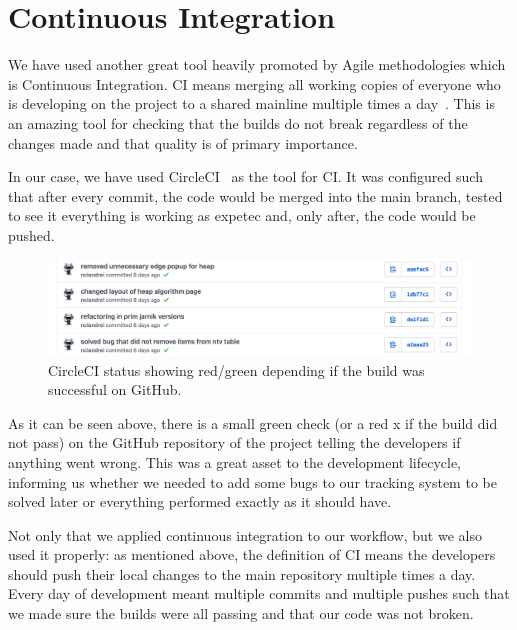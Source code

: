 \documentclass{l4proj}
\begin{document}
\section{Continuous Integration}

We have used another great tool heavily promoted by Agile methodologies which is Continuous Integration. CI means
merging all working copies of everyone who is developing on the project to a shared mainline multiple times a
day~\cite{continuous-integration}. This is an amazing tool for checking that the builds do not break regardless of the
changes made and that quality is of primary importance.

In our case, we have used CircleCI~\cite{circleci} as the tool for CI. It was configured such that after every
commit, the code would be merged into the main branch, tested to see it everything is working as expetec and, only
after, the code would be pushed.

\begin{figure}[!ht]
    \centering
    \includegraphics[scale=0.5]{circleci}
    \caption{CircleCI status showing red/green depending if the build was successful on GitHub.}
    \label{fig:circleci}
\end{figure}

As it can be seen above, there is a small green check (or a red x if the build did not pass) on the GitHub repository
of the project telling the developers if anything went wrong. This was a great asset to the development lifecycle,
informing us whether we needed to add some bugs to our tracking system to be solved later or everything performed
exactly as it should have.

Not only that we applied continuous integration to our workflow, but we also used it properly: as
mentioned above, the definition of CI means the developers should push their local changes to the main repository
multiple times a day. Every day of development meant multiple commits and multiple pushes such that we made sure the
builds were all passing and that our code was not broken.
\end{document}
